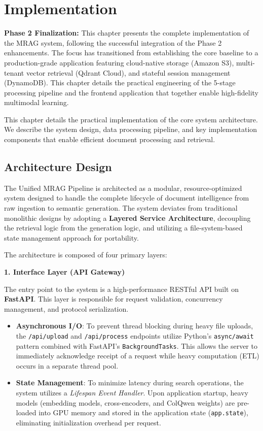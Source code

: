 \chapter{Implementation}

\textbf{Phase 2 Finalization:} This chapter presents the complete implementation of the MRAG system, following the successful integration of the Phase 2 enhancements. The focus has transitioned from establishing the core baseline to a production-grade application featuring cloud-native storage (Amazon S3), multi-tenant vector retrieval (Qdrant Cloud), and stateful session management (DynamoDB). This chapter details the practical engineering of the 5-stage processing pipeline and the frontend application that together enable high-fidelity multimodal learning.

This chapter details the practical implementation of the core system architecture. We describe the system design, data processing pipeline, and key implementation components that enable efficient document processing and retrieval.

\section{Architecture Design}

The Unified MRAG Pipeline is architected as a modular, resource-optimized system designed to handle the complete lifecycle of document intelligence from raw ingestion to semantic generation. The system deviates from traditional monolithic designs by adopting a \textbf{Layered Service Architecture}, decoupling the retrieval logic from the generation logic, and utilizing a file-system-based state management approach for portability.

The architecture is composed of four primary layers:

\textbf{1. Interface Layer (API Gateway)}

The entry point to the system is a high-performance RESTful API built on \textbf{FastAPI}. This layer is responsible for request validation, concurrency management, and protocol serialization.
\begin{itemize}
    \item \textbf{Asynchronous I/O}: To prevent thread blocking during heavy file uploads, the \texttt{/api/upload} and \texttt{/api/process} endpoints utilize Python's \texttt{async/await} pattern combined with FastAPI's \texttt{BackgroundTasks}. This allows the server to immediately acknowledge receipt of a request while heavy computation (ETL) occurs in a separate thread pool.
    \item \textbf{State Management}: To minimize latency during search operations, the system utilizes a \textit{Lifespan Event Handler}. Upon application startup, heavy models (embedding models, cross-encoders, and ColQwen weights) are pre-loaded into GPU memory and stored in the application state (\texttt{app.state}), eliminating initialization overhead per request.
\end{itemize}

